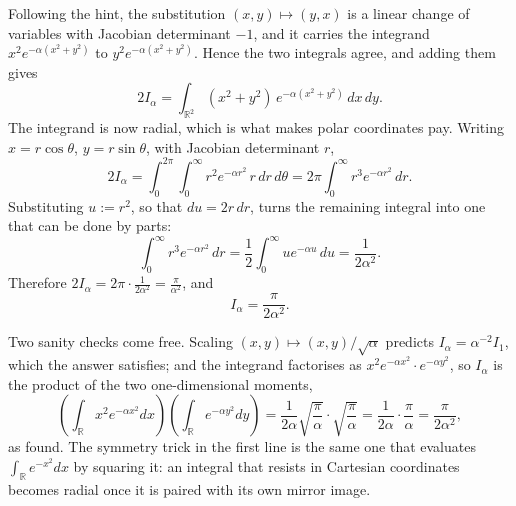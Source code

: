 \begin{exercisesolution}
\label{sol:gaussian_second_moment_polar}
Following the hint, the substitution $(x,y) \mapsto (y,x)$ is a linear change of variables with
Jacobian determinant $-1$, and it carries the integrand $x^2e^{-\alpha(x^2+y^2)}$ to
$y^2e^{-\alpha(x^2+y^2)}$. Hence the two integrals agree, and adding them gives
\[2I_\alpha = \int_{\mathbb{R}^2} (x^2+y^2)\,e^{-\alpha(x^2+y^2)} \, dx\,dy .\]
The integrand is now radial, which is what makes polar coordinates pay. Writing $x = r\cos\theta$,
$y = r\sin\theta$, with Jacobian determinant $r$,
\[2I_\alpha = \int_0^{2\pi}\!\!\int_0^\infty r^2 e^{-\alpha r^2}\, r\,dr\,d\theta
  = 2\pi \int_0^\infty r^3 e^{-\alpha r^2}\,dr .\]
Substituting $u := r^2$, so that $du = 2r\,dr$, turns the remaining integral into one that can be
done by parts:
\[\int_0^\infty r^3 e^{-\alpha r^2}\,dr = \frac12 \int_0^\infty u e^{-\alpha u}\,du
  = \frac{1}{2\alpha^2}.\]
Therefore $2I_\alpha = 2\pi \cdot \frac{1}{2\alpha^2} = \frac{\pi}{\alpha^2}$, and
\[I_\alpha = \frac{\pi}{2\alpha^2}.\]
\begin{remark}
Two sanity checks come free. Scaling $(x,y) \mapsto (x,y)/\sqrt\alpha$ predicts $I_\alpha =
\alpha^{-2} I_1$, which the answer satisfies; and the integrand factorises as
$x^2e^{-\alpha x^2}\cdot e^{-\alpha y^2}$, so $I_\alpha$ is the product of the two
one-dimensional moments,
\[\left(\int_{\mathbb{R}} x^2e^{-\alpha x^2}dx\right)\left(\int_{\mathbb{R}} e^{-\alpha y^2}dy\right)
  = \frac{1}{2\alpha}\sqrt{\frac{\pi}{\alpha}}\cdot\sqrt{\frac{\pi}{\alpha}}
  = \frac{1}{2\alpha}\cdot\frac{\pi}{\alpha} = \frac{\pi}{2\alpha^2},\]
as found. The symmetry trick in the first line is the same one that
evaluates $\int_{\mathbb{R}} e^{-x^2}dx$ by squaring it: an integral that resists in Cartesian
coordinates becomes radial once it is paired with its own mirror image.
\end{remark}
\end{exercisesolution}

